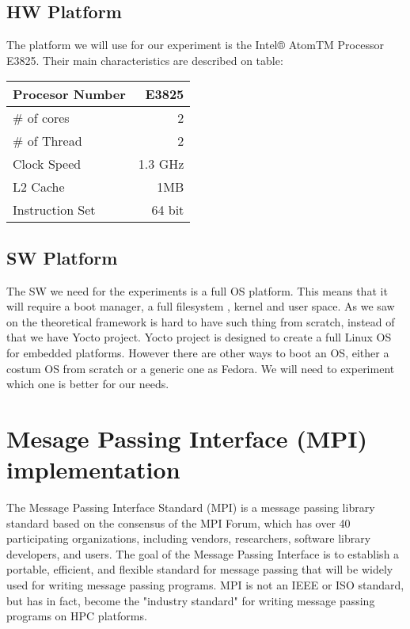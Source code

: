     \subsection{HW Platform} 
    The platform we will use for our experiment is the Intel® AtomTM Processor
    E3825. Their main characteristics are described on table:

    \begin{center}
    \begin{tabular}{ | l | r |}
        \hline
        Procesor Number & E3825  \\ \hline
        \# of cores & 2  \\ \hline
        \# of Thread & 2  \\ \hline
        Clock Speed & 1.3 GHz  \\ \hline
        L2 Cache & 1MB  \\ \hline
        Instruction Set & 64 bit  \\ \hline
    \end{tabular}
     \label{tab:title} 
    \end{center}


    \subsection{SW Platform} 
    The SW we need for the experiments is a full OS platform. This means that
    it will require a boot manager, a full filesystem , kernel and user space.
    As we saw on the theoretical framework is hard to have such thing from
    scratch, instead of that we have Yocto project. Yocto project is designed
    to create a full Linux OS for embedded platforms. However there are other
    ways to boot an OS, either a costum OS from scratch or a generic one as
    Fedora. We will need to experiment which one is better for our needs.

\section{Mesage Passing Interface (MPI) implementation}
\noindent

The Message Passing Interface Standard (MPI) is a message passing library
standard based on the consensus of the MPI Forum, which has over 40
participating organizations, including vendors, researchers, software library
developers, and users. The goal of the Message Passing Interface is to
establish a portable, efficient, and flexible standard for message passing
that will be widely used for writing message passing programs. MPI is not an IEEE
or ISO standard, but has in fact, become the "industry standard" for writing
message passing programs on HPC platforms. 

